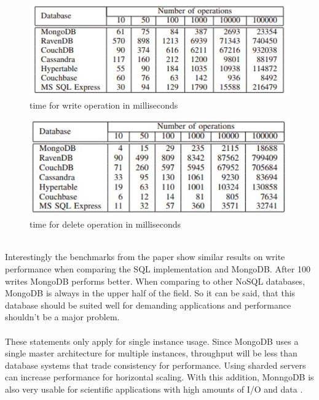\begin{figure}[H]
\includegraphics[width=\linewidth,keepaspectratio]{images/Performance_Writes.JPG}
\caption{time for write operation in milliseconds}
\label{arch-example3}
\end{figure}
\begin{figure}[H]
\includegraphics[width=\linewidth,keepaspectratio]{images/Performance_Delete.JPG}
\caption{time for delete operation in milliseconds}
\label{arch-exampl1}
\end{figure}
\\
Interestingly the benchmarks from the paper show similar results on write performance when comparing the SQL implementation and MongoDB. After 100 writes MongoDB performs better. When comparing to other NoSQL databases, MongoDB is always in the upper half of the field. So it can be said, that this database should be suited well for demanding applications and performance shouldn't be a major problem. 
\\\\
These statements only apply for single instance usage. Since MongoDB uses a single master architecture for multiple instances, throughput will be less than database systems that trade consistency for performance. Using sharded servers can increase performance for horizontal scaling. With this addition, MonngoDB is also very usable for scientific applications with high amounts of I/O and data \cite{Dede_Performance_2013}.



